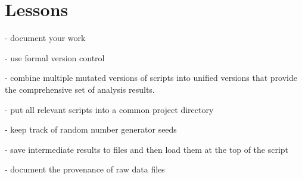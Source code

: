 \section{Lessons}

- document your work

- use formal version control

- combine multiple mutated versions of scripts into unified versions
  that provide the comprehensive set of analysis results.

- put all relevant scripts into a common project directory

- keep track of random number generator seeds

- save intermediate results to files and then load them at the top of
  the script

- document the provenance of raw data files
